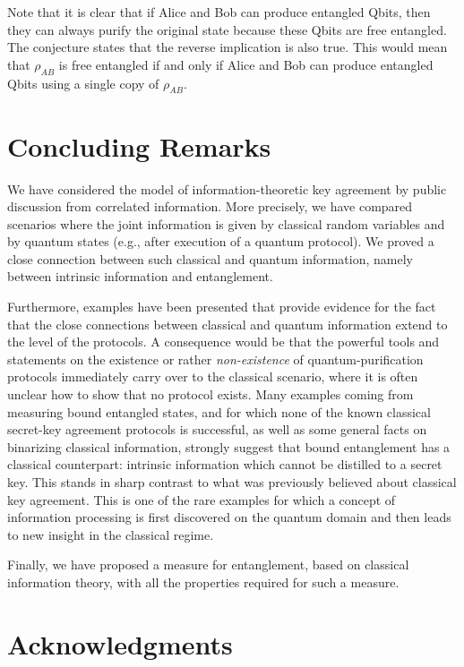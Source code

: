 \documentclass{article}
\begin{document}
Note that it is clear that if Alice and Bob can produce entangled 
Qbits, then they can always purify the original state because 
these Qbits are free entangled. The conjecture states that the
reverse implication 
is also true. 
This would mean that $\rho_{AB}$ is free entangled if and only if  Alice and
Bob can produce entangled Qbits using a single copy of $\rho_{AB}$.







\section{Concluding Remarks}
We have considered the model of information-theoretic key agreement 
by public discussion from correlated information. More precisely, 
we have compared  scenarios where the joint information is 
given by classical random variables and by quantum states (e.g., after 
execution of a quantum protocol). We proved a close connection between
such classical and quantum information,  namely between
intrinsic information and entanglement.


Furthermore,
 examples have been presented that provide 
 evidence for the fact that the close connections between classical and quantum 
information extend to the level of the 
protocols. A consequence would be that  the powerful tools and statements 
on the existence or rather {\em non-existence\/} of quantum-purification
protocols immediately carry over to the classical scenario, where it 
is often  unclear how 
to show that no protocol exists.
Many examples
coming from measuring bound entangled states, and for which none 
of the known classical secret-key agreement protocols is successful,
as well as some general facts on binarizing classical information,
strongly
suggest that bound entanglement  has a classical counterpart:
intrinsic information which cannot be distilled to a secret key.
This stands in sharp contrast to what was previously believed about 
classical key agreement.
This is one of the rare examples for which 
 a concept of 
information processing is first discovered on the quantum domain
and then leads to new insight in the classical regime.



Finally, we have proposed a measure for entanglement, based on classical 
information theory, with all  the properties required for such a measure.


\section*{Acknowledgments}
\end{document}
